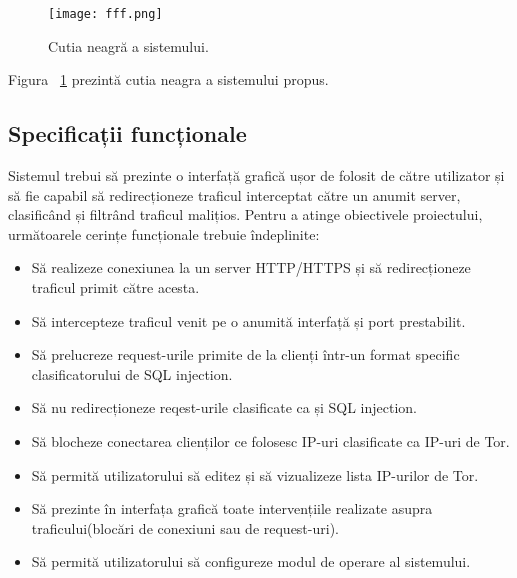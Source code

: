 \begin{figure}[h]
	\centering
	\texttt{[image: fff.png]}
	\caption{ Cutia neagră a sistemului.}
	\label{fig:black-box}
\end{figure}

Figura ~\ref{fig:black-box} prezintă cutia neagra a sistemului propus. \\

 \subsection{Specificații funcționale}

Sistemul trebui să prezinte o interfață grafică ușor de folosit de către utilizator și să fie capabil să redirecționeze traficul interceptat către un anumit server, clasificând și filtrând traficul malițios. Pentru a atinge obiectivele proiectului, următoarele cerințe funcționale trebuie îndeplinite: 
\begin{itemize}
  \item  Să realizeze conexiunea la un server HTTP/HTTPS și să redirecționeze traficul primit către acesta. 
  \item  Să intercepteze traficul venit pe o anumită interfață și port prestabilit. 
  \item  Să prelucreze request-urile primite de la clienți într-un format specific clasificatorului de SQL injection. 
  \item  Să nu redirecționeze reqest-urile clasificate ca și SQL injection. 
  \item  Să blocheze conectarea clienților ce folosesc IP-uri clasificate ca IP-uri de Tor. 
  \item  Să permită utilizatorului să editez și să vizualizeze lista IP-urilor de Tor. 
  \item  Să prezinte în interfața grafică toate intervențiile realizate asupra traficului(blocări de conexiuni sau de request-uri). 
  \item  Să permită utilizatorului să configureze modul de operare al sistemului. 
\end{itemize}



